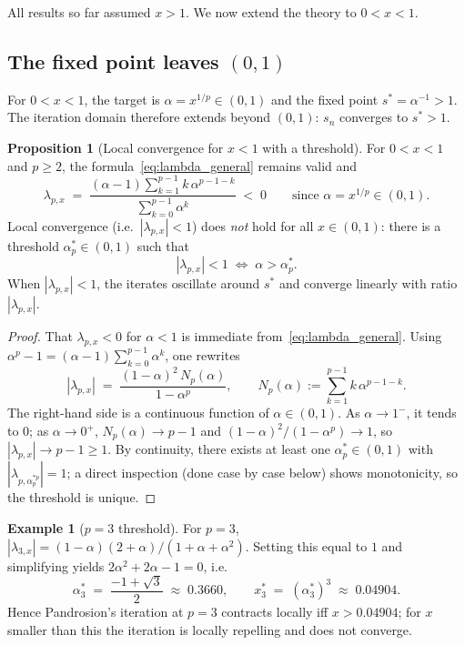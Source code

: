 \documentclass[11pt,a4paper]{article}
\theoremstyle{definition}
\newtheorem{proposition}{Proposition}[section]
\newtheorem{example}{Example}[section]
\begin{document}
All results so far assumed $x > 1$. We now extend the theory to $0 < x < 1$.

\subsection{The fixed point leaves $(0,1)$}

For $0 < x < 1$, the target is $\alpha = x^{1/p} \in (0,1)$ and the fixed point $s^* = \alpha^{-1} > 1$. The iteration domain therefore extends beyond $(0,1)$: $s_n$ converges to $s^* > 1$.

\begin{proposition}[Local convergence for $x < 1$ with a threshold]
\label{prop:x_small}
For $0 < x < 1$ and $p \geq 2$, the formula~\eqref{eq:lambda_general} remains valid and
\[
  \lambda_{p,x}
  \;=\; \frac{(\alpha - 1)\sum_{k=1}^{p-1}k\,\alpha^{p-1-k}}{\sum_{k=0}^{p-1}\alpha^k}
  \;<\; 0
  \qquad \text{since } \alpha = x^{1/p} \in (0,1).
\]
Local convergence (i.e.\ $|\lambda_{p,x}| < 1$) does \emph{not} hold for all $x \in (0,1)$: there is a threshold $\alpha^\ast_p \in (0,1)$ such that
\[
  |\lambda_{p,x}| < 1
  \;\iff\;
  \alpha > \alpha^\ast_p.
\]
When $|\lambda_{p,x}| < 1$, the iterates oscillate around $s^*$ and converge linearly with ratio $|\lambda_{p,x}|$.
\end{proposition}

\begin{proof}
That $\lambda_{p,x} < 0$ for $\alpha < 1$ is immediate from~\eqref{eq:lambda_general}. Using $\alpha^p - 1 = (\alpha - 1) \sum_{k=0}^{p-1} \alpha^k$, one rewrites
\begin{equation}\label{eq:lambda-alt}
  |\lambda_{p,x}| \;=\; \frac{(1-\alpha)^2 \, N_p(\alpha)}{1 - \alpha^p},
  \qquad N_p(\alpha) := \sum_{k=1}^{p-1} k\, \alpha^{p-1-k}.
\end{equation}
The right-hand side is a continuous function of $\alpha \in (0,1)$. As $\alpha \to 1^-$, it tends to $0$; as $\alpha \to 0^+$, $N_p(\alpha) \to p-1$ and $(1-\alpha)^2 / (1-\alpha^p) \to 1$, so $|\lambda_{p,x}| \to p - 1 \geq 1$. By continuity, there exists at least one $\alpha^\ast_p \in (0,1)$ with $|\lambda_{p,\alpha^{\ast p}_p}| = 1$; a direct inspection (done case by case below) shows monotonicity, so the threshold is unique.
\end{proof}

\begin{example}[$p = 3$ threshold]\label{ex:p3-threshold}
For $p = 3$, $|\lambda_{3,x}| = (1-\alpha)(2+\alpha)/(1 + \alpha + \alpha^2)$. Setting this equal to $1$ and simplifying yields $2\alpha^2 + 2\alpha - 1 = 0$, i.e.
\[
  \alpha^\ast_3 \;=\; \frac{-1 + \sqrt{3}}{2} \;\approx\; 0.3660,
  \qquad
  x^\ast_3 \;=\; (\alpha^\ast_3)^3 \;\approx\; 0.04904.
\]
Hence Pandrosion's iteration at $p = 3$ contracts locally iff $x > 0.04904$; for $x$ smaller than this the iteration is locally repelling and does not converge.
\end{example}
\end{document}
